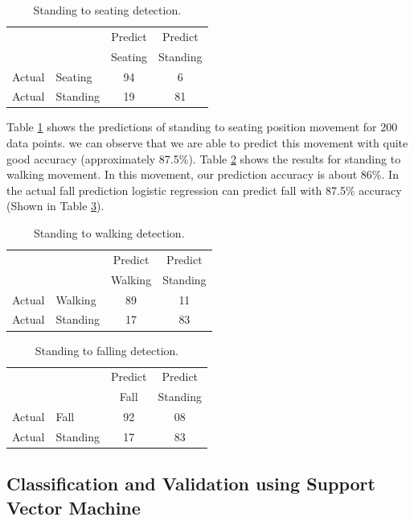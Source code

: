 \documentclass[letterpaper]{article}
\begin{document}
\begin{table}[!ht]
	\caption{Standing to seating detection.}	
	\label{tab:StandingToSeatingDetection}
	\centering
		\begin{tabular} {l l |c |c}
			& & Predict& Predict \\ 
			& & Seating & Standing \\ \hline
			Actual& Seating & 94 & 6\\ \hline
			Actual& Standing & 19& 81\\ \hline
		\end{tabular}
\end{table}

Table \ref{tab:StandingToSeatingDetection} shows the predictions of standing to seating position
movement for 200 data points. we can observe that we are able
to predict this movement with quite good accuracy (approximately 87.5\%). Table
 \ref{tab:StandingToWalkingDetection} shows the results for  standing to walking movement. In this
movement, our prediction accuracy is about 86\%. In the actual fall prediction logistic
regression can predict fall with 87.5\% accuracy (Shown in Table
 \ref{tab:StandingToFallingDetection}).

\begin{table}
\caption{Standing to walking detection.}
	\label{tab:StandingToWalkingDetection}
\centering
		\begin{tabular} {l l |c |c}
			& & Predict& Predict \\ 
			& & Walking & Standing \\ \hline
			Actual& Walking & 89 & 11\\ \hline
			Actual& Standing & 17& 83\\ \hline
		\end{tabular}
\end{table}

\begin{table}[!ht]
\caption{Standing to falling detection.}
\label{tab:StandingToFallingDetection}
\centering
		\begin{tabular} {l l |c |c}
			& & Predict& Predict \\ 
			& & Fall & Standing \\ \hline
			Actual& Fall & 92 & 08\\ \hline
			Actual& Standing & 17& 83\\ \hline
		\end{tabular}
\end{table}

\subsection*{Classification and Validation using Support Vector Machine}
\end{document}
